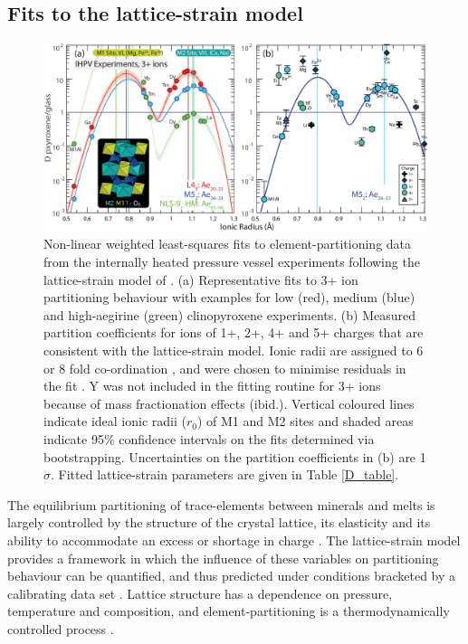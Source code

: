 \documentclass[review,authoryear,12pt]{elsarticle}
\begin{document}
\subsection{Fits to the lattice-strain model}

        \begin{figure}[tb]
        \begin{center}
        \includegraphics[width=1\textwidth]{8_Latticestrain-01.eps}
        \caption[Lattice-strain fits to  element-partition coefficients]{Non-linear weighted least-squares fits to element-partitioning data from the internally heated pressure vessel experiments following the lattice-strain model of \citet{Blundy1994}. (a) Representative fits to 3+ ion partitioning behaviour with examples for low (red), medium (blue) and high-aegirine (green) clinopyroxene experiments. (b) Measured partition coefficients for ions of 1+, 2+, 4+ and 5+ charges that are consistent with the lattice-strain model. Ionic radii are assigned to 6 or 8 fold co-ordination \citep{Shannon1976}, and were chosen to minimise residuals in the fit \citep[cf.][]{Olin2010}. Y was not included in the fitting routine for 3+ ions because of mass fractionation effects (ibid.).
        Vertical coloured lines indicate ideal ionic radii ($r_0$) of M1 and M2 sites and shaded areas indicate 95\% confidence intervals on the fits determined via bootstrapping. Uncertainties on the partition coefficients in (b) are 1$\sigma$. Fitted lattice-strain parameters are given in Table \ref{D_table}.}
        \label{8_Latticestrain3}
        \end{center}
        \end{figure}

The equilibrium partitioning of trace-elements between minerals and melts is largely controlled by the structure of the crystal lattice, its elasticity \citep{Onuma1968, Kumazawa1969, Weidner1982} and its ability to accommodate an excess or shortage in charge \citep{Blundy1998, Wood2001charge, Hanchar2001, Corgne2005CMP}. The lattice-strain model provides a framework in which the influence of these variables on partitioning behaviour can be quantified, and thus predicted under conditions bracketed by a calibrating data set \citep{Onuma1968, Blundy1994, Wood2014}. Lattice structure has a dependence on pressure, temperature and composition, and element-partitioning is a thermodynamically controlled process \citep[e.g.][]{Wood1997}.
\end{document}
